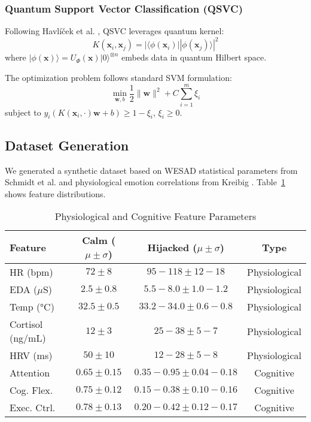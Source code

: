 \documentclass[11pt,letterpaper]{article}
\newcommand{\ket}[1]{|#1\rangle}
\newcommand{\bra}[1]{\langle#1|}
\begin{document}
\subsubsection{Quantum Support Vector Classification (QSVC)}

Following Havlíček et al. \cite{havlicek2019supervised}, QSVC leverages quantum kernel:
\begin{equation}
K(\mathbf{x}_i, \mathbf{x}_j) = |\bra{\phi(\mathbf{x}_i)}\ket{\phi(\mathbf{x}_j)}|^2
\label{eq:quantum_kernel}
\end{equation}
where $\ket{\phi(\mathbf{x})} = U_{\Phi}(\mathbf{x})\ket{0}^{\otimes n}$ embeds data in quantum Hilbert space.

The optimization problem follows standard SVM formulation:
\begin{equation}
\min_{\mathbf{w},b} \frac{1}{2}\|\mathbf{w}\|^2 + C\sum_{i=1}^{m}\xi_i
\label{eq:svc_optimization}
\end{equation}
subject to $y_i(K(\mathbf{x}_i, \cdot)\mathbf{w} + b) \geq 1 - \xi_i$, $\xi_i \geq 0$.

\subsection{Dataset Generation}

We generated a synthetic dataset based on WESAD statistical parameters from Schmidt et al. \cite{schmidt2018introducing} and physiological emotion correlations from Kreibig \cite{kreibig2010autonomic}. Table~\ref{tab:dataset_features} shows feature distributions.

\begin{table}[h]
\centering
\caption{Physiological and Cognitive Feature Parameters}
\label{tab:dataset_features}
\small
\begin{tabular}{lccc}
\toprule
\textbf{Feature} & \textbf{Calm ($\mu \pm \sigma$)} & \textbf{Hijacked ($\mu \pm \sigma$)} & \textbf{Type} \\
\midrule
HR (bpm) & $72 \pm 8$ & $95-118 \pm 12-18$ & Physiological \\
EDA ($\mu$S) & $2.5 \pm 0.8$ & $5.5-8.0 \pm 1.0-1.2$ & Physiological \\
Temp (°C) & $32.5 \pm 0.5$ & $33.2-34.0 \pm 0.6-0.8$ & Physiological \\
Cortisol (ng/mL) & $12 \pm 3$ & $25-38 \pm 5-7$ & Physiological \\
HRV (ms) & $50 \pm 10$ & $12-28 \pm 5-8$ & Physiological \\
Attention & $0.65 \pm 0.15$ & $0.35-0.95 \pm 0.04-0.18$ & Cognitive \\
Cog. Flex. & $0.75 \pm 0.12$ & $0.15-0.38 \pm 0.10-0.16$ & Cognitive \\
Exec. Ctrl. & $0.78 \pm 0.13$ & $0.20-0.42 \pm 0.12-0.17$ & Cognitive \\
\bottomrule
\end{tabular}
\end{table}
\end{document}
